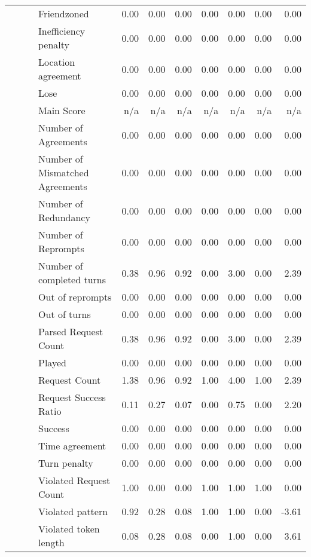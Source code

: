 \begin{tabular}{llllrrrrrrr}
 &  &  & Friendzoned & 0.00 & 0.00 & 0.00 & 0.00 & 0.00 & 0.00 & 0.00 \\
 &  &  & Inefficiency penalty & 0.00 & 0.00 & 0.00 & 0.00 & 0.00 & 0.00 & 0.00 \\
 &  &  & Location agreement & 0.00 & 0.00 & 0.00 & 0.00 & 0.00 & 0.00 & 0.00 \\
 &  &  & Lose & 0.00 & 0.00 & 0.00 & 0.00 & 0.00 & 0.00 & 0.00 \\
 &  &  & Main Score & n/a & n/a & n/a & n/a & n/a & n/a & n/a \\
 &  &  & Number of Agreements & 0.00 & 0.00 & 0.00 & 0.00 & 0.00 & 0.00 & 0.00 \\
 &  &  & Number of Mismatched Agreements & 0.00 & 0.00 & 0.00 & 0.00 & 0.00 & 0.00 & 0.00 \\
 &  &  & Number of Redundancy & 0.00 & 0.00 & 0.00 & 0.00 & 0.00 & 0.00 & 0.00 \\
 &  &  & Number of Reprompts & 0.00 & 0.00 & 0.00 & 0.00 & 0.00 & 0.00 & 0.00 \\
 &  &  & Number of completed turns & 0.38 & 0.96 & 0.92 & 0.00 & 3.00 & 0.00 & 2.39 \\
 &  &  & Out of reprompts & 0.00 & 0.00 & 0.00 & 0.00 & 0.00 & 0.00 & 0.00 \\
 &  &  & Out of turns & 0.00 & 0.00 & 0.00 & 0.00 & 0.00 & 0.00 & 0.00 \\
 &  &  & Parsed Request Count & 0.38 & 0.96 & 0.92 & 0.00 & 3.00 & 0.00 & 2.39 \\
 &  &  & Played & 0.00 & 0.00 & 0.00 & 0.00 & 0.00 & 0.00 & 0.00 \\
 &  &  & Request Count & 1.38 & 0.96 & 0.92 & 1.00 & 4.00 & 1.00 & 2.39 \\
 &  &  & Request Success Ratio & 0.11 & 0.27 & 0.07 & 0.00 & 0.75 & 0.00 & 2.20 \\
 &  &  & Success & 0.00 & 0.00 & 0.00 & 0.00 & 0.00 & 0.00 & 0.00 \\
 &  &  & Time agreement & 0.00 & 0.00 & 0.00 & 0.00 & 0.00 & 0.00 & 0.00 \\
 &  &  & Turn penalty & 0.00 & 0.00 & 0.00 & 0.00 & 0.00 & 0.00 & 0.00 \\
 &  &  & Violated Request Count & 1.00 & 0.00 & 0.00 & 1.00 & 1.00 & 1.00 & 0.00 \\
 &  &  & Violated pattern & 0.92 & 0.28 & 0.08 & 1.00 & 1.00 & 0.00 & -3.61 \\
 &  &  & Violated token length & 0.08 & 0.28 & 0.08 & 0.00 & 1.00 & 0.00 & 3.61 \\
\cline{3-11}

\end{tabular}
